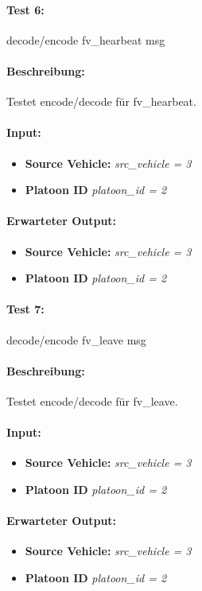 \documentclass[a4paper, 12pt, titlepage]{scrartcl}
\begin{document}
{			\paragraph{Test 6:}{decode/encode fv\_hearbeat msg}
			\paragraph{Beschreibung:} Testet encode/decode für fv\_hearbeat.
			\paragraph{Input:}
			\begin{itemize} \itemsep-0.5em
				\item \textbf{Source Vehicle:} \emph{src\_vehicle = 3}
				\item \textbf{Platoon ID} \emph{platoon\_id = 2}
			\end{itemize}
			\paragraph{Erwarteter Output:}
			\begin{itemize} \itemsep-0.5em
				\item \textbf{Source Vehicle:} \emph{src\_vehicle = 3}
				\item \textbf{Platoon ID} \emph{platoon\_id = 2}
			\end{itemize}

			\paragraph{Test 7:}{decode/encode fv\_leave msg}
			\paragraph{Beschreibung:} Testet encode/decode für fv\_leave.
			\paragraph{Input:}
			\begin{itemize} \itemsep-0.5em
				\item \textbf{Source Vehicle:} \emph{src\_vehicle = 3}
				\item \textbf{Platoon ID} \emph{platoon\_id = 2}
			\end{itemize}
			\paragraph{Erwarteter Output:}
			\begin{itemize} \itemsep-0.5em
				\item \textbf{Source Vehicle:} \emph{src\_vehicle = 3}
				\item \textbf{Platoon ID} \emph{platoon\_id = 2}
			\end{itemize}

}
\end{document}
